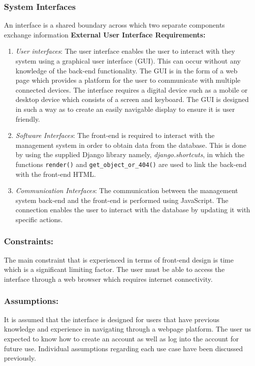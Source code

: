 \documentclass[10pt,twocolumn]{witseiepaper}
\begin{document}
	\subsubsection{System Interfaces}
	An interface is a shared boundary across which two separate components exchange information
	\newline
	\textbf{External User Interface Requirements: }
	\begin{enumerate}
		\item \textit{User interfaces}: The user interface enables the user to interact with they system using a graphical user interface (GUI). This can occur without any knowledge of the back-end functionality. The GUI is in the form of a web page which provides a platform for the user to communicate with multiple connected devices. The interface requires a digital device such as a mobile or desktop device which consists of a screen and keyboard. The GUI is designed in such a way as to create an easily navigable display to ensure it is user friendly.
		\item \textit{Software Interfaces}: The front-end is required to interact with the management system in order to obtain data from the database. This is done by using the supplied Django library namely, \textit{django.shortcuts}, in which the functions \texttt{render()} and \texttt{get\_object\_or\_404()} are used to link the back-end with the front-end HTML. 
		\item \textit{Communication Interfaces}: The communication between the management system back-end and the front-end is performed using JavaScript. The connection enables the user to interact with the database by updating it with specific actions.
	\end{enumerate}
	
	\subsubsection{Constraints:}
	The main constraint that is experienced in terms of front-end design is time which is a significant limiting factor. The user must be able to access the interface through a web browser which requires internet connectivity.
	\subsubsection{Assumptions:}
	It is assumed that the interface is designed for users that have previous knowledge and experience in navigating through a webpage platform. The user us expected to know how to create an account as well as log into the account for future use. Individual assumptions regarding each use case have been discussed previously. \\
\end{document}
